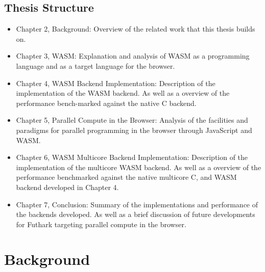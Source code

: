 \documentclass[11pt]{book}
\begin{document}



\setcounter{page}{1}
\section{Thesis Structure}


\begin{itemize}
    \item Chapter 2, Background:
    Overview of the related work that this thesis builds on.

    \item Chapter 3, WASM:
    Explanation and analysis of WASM as a programming language and as a target language for the browser. 
    
    \item Chapter 4, WASM  Backend Implementation:
     Description of the implementation of the WASM backend. As well as a overview of the performance bench-marked against the native C backend.
    
    \item Chapter 5, Parallel Compute in the Browser:
    Analysis of the facilities and paradigms for parallel programming in the browser through JavaScript and WASM. 
    
    \item Chapter 6, WASM Multicore Backend Implementation:
    Description of the implementation of the multicore WASM backend. As well as a overview of the performance benchmarked against the native multicore C, and WASM backend developed in Chapter 4.
    
    \item Chapter 7, Conclusion:
    Summary of the implementations and performance of the backends developed. As well as a brief discussion of future developments for Futhark targeting parallel compute in the browser.
    
\end{itemize}
\chapter{Background}
\end{document}

